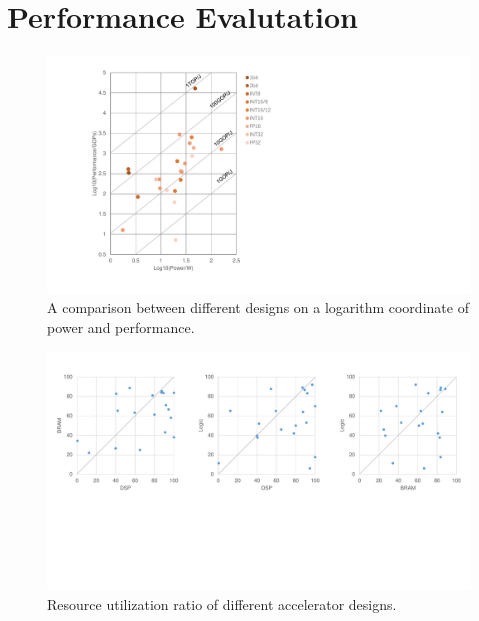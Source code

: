 \section{Performance Evalutation}



\begin{figure}[h]
    \centering
    \includegraphics[width=0.6\columnwidth]{fig/efficiency.pdf}
    \caption{A comparison between different designs on a logarithm coordinate of power and performance. }
    \label{fig:roofline}
\end{figure}

\begin{figure}[h]
    \centering
    \includegraphics[width=1.0\columnwidth]{fig/resource.pdf}
    \caption{Resource utilization ratio of different accelerator designs.}
    \label{fig:roofline}
\end{figure}